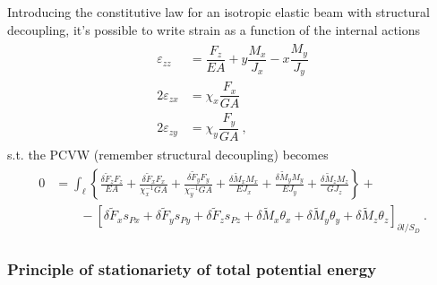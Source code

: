 \documentclass[letterpaper,10pt,english]{jupyterBook}
\begin{document}
\sphinxAtStartPar
Introducing the constitutive law for an isotropic elastic beam with structural decoupling, it’s possible to write strain as a function of the internal actions
\begin{equation*}
\begin{split}\begin{aligned}
    \varepsilon_{zz} & = \dfrac{F_z}{EA} + y \dfrac{M_x}{J_x} - x \dfrac{M_y}{J_y} \\
  2 \varepsilon_{zx} & = \chi_x \dfrac{F_x}{GA} \\
  2 \varepsilon_{zy} & = \chi_y \dfrac{F_y}{GA} \ ,
\end{aligned}\end{split}
\end{equation*}
\sphinxAtStartPar
s.t. the PCVW (remember structural decoupling) becomes
\begin{equation*}
\begin{split}\begin{aligned}
 0 
 & = \int_{\ell} \left\{ \frac{\delta \widetilde{F}_z F_z}{E A} + \frac{\delta \widetilde{F}_x F_x}{\chi^{-1}_x G A} + \frac{\delta \widetilde{F}_y F_y}{\chi^{-1}_y G A} + \frac{\delta \widetilde{M}_x M_x}{EJ_x} + \frac{\delta \widetilde{M}_y M_y}{EJ_y} + \frac{\delta \widetilde{M}_z M_z}{GJ_z}  \right\} + \\
 & \qquad - \left[ \delta \widetilde{F}_x s_{Px} + \delta \widetilde{F}_y s_{Py} + \delta \widetilde{F}_z s_{Pz} + \delta \widetilde{M}_x \theta_x + \delta \widetilde{M}_y \theta_y + \delta \widetilde{M}_z \theta_z \right]_{\partial l / S_D} \ .
\end{aligned}\end{split}
\end{equation*}

\subsubsection{Principle of stationariety of total potential energy}
\label{\detokenize{ch/solids/small-displacements-statics-beams-weak-form:principle-of-stationariety-of-total-potential-energy}}\label{\detokenize{ch/solids/small-displacements-statics-beams-weak-form:solid-mechanics-intro-small-displacements-statics-beam-weak-form-weak-stationariety-potential}}
\end{document}
